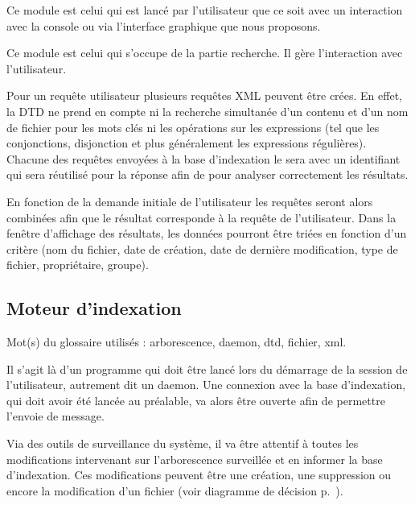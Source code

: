 \documentclass[a4paper,12pt]{report}
\begin{document}
Ce module est celui qui est lancé par l'utilisateur que ce soit avec un interaction avec la console ou via l'interface graphique que nous proposons.

Ce module est celui qui s'occupe de la partie recherche. Il gère l'interaction avec l'utilisateur.

Pour un requête utilisateur plusieurs requêtes XML peuvent être crées. En effet, la DTD ne prend en compte ni la recherche simultanée d'un contenu et d'un nom de fichier pour les mots clés ni les opérations sur les expressions (tel que les conjonctions, disjonction et plus généralement les expressions régulières). Chacune des requêtes envoyées à la base d'indexation le sera avec un identifiant qui sera réutilisé pour la réponse afin de pour analyser correctement les résultats.

En fonction de la demande initiale de l'utilisateur les requêtes seront alors combinées afin que le résultat corresponde à la requête de l'utilisateur. Dans la fenêtre d'affichage des résultats, les données pourront être triées en fonction d'un critère (nom du fichier, date de création, date de dernière modification, type de fichier, propriétaire, groupe).

\subsection{Moteur d'indexation}
Mot(s) du glossaire utilisés : \gls{arborescence}, \gls{daemon}, \gls{dtd}, \gls{fichier}, \gls{xml}.

Il s'agit là d'un programme qui doit être lancé lors du démarrage de la session de l'utilisateur, autrement dit un daemon. Une connexion avec la base d'indexation, qui doit avoir été lancée au préalable, va alors être ouverte afin de permettre l'envoie de message.

Via des outils de surveillance du système, il va être attentif à toutes les modifications intervenant sur l'arborescence surveillée et en informer la base d'indexation. Ces modifications peuvent être une création, une suppression ou encore la modification d'un fichier (voir diagramme de décision p.~\pageref{decision-daemon}).
\end{document}
